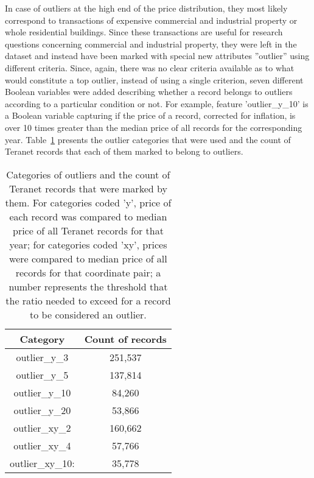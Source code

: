 In case of outliers at the high end of the price distribution, they most likely correspond to transactions of expensive commercial and industrial property or whole residential buildings.
Since these transactions are useful for research questions concerning commercial and industrial property, they were left in the dataset and instead have been marked with special new attributes ''outlier'' using different criteria.
Since, again, there was no clear criteria available as to what would constitute a top outlier, instead of using a single criterion, seven different Boolean variables were added describing whether a record belongs to outliers according to a particular condition or not.
For example, feature 'outlier\_y\_10' is a Boolean variable capturing if the price of a record, corrected for inflation, is over 10 times greater than the median price of all records for the corresponding year.
Table~\ref{tab:outliers} presents the outlier categories that were used and the count of Teranet records that each of them marked to belong to outliers.

\begin{table}[h!]
    \centering
    \begin{tabular}{|| c | c ||}
        \hline
        Category & Count of records \\
        \hline
        \hline
        outlier\_y\_3 & 251,537 \\
        \hline
        outlier\_y\_5 & 137,814 \\
        \hline
        outlier\_y\_10 & 84,260 \\
        \hline
        outlier\_y\_20 & 53,866 \\
        \hline
        outlier\_xy\_2 & 160,662 \\
        \hline
        outlier\_xy\_4 & 57,766 \\
        \hline
        outlier\_xy\_10: & 35,778 \\
        \hline
    \end{tabular}
    \caption{Categories of outliers and the count of Teranet records that were marked by them.
    For categories coded 'y', price of each record was compared to median price of all Teranet records for that year;
    for categories coded 'xy', prices were compared to median price of all records for that coordinate pair;
    a number represents the threshold that the ratio needed to exceed for a record to be considered an outlier.}
    \label{tab:outliers}

\end{table}

